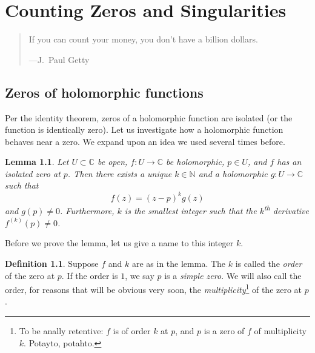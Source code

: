 \documentclass[12pt,openany]{book}
\newcommand{\C}{{\mathbb{C}}}
\newcommand{\N}{{\mathbb{N}}}
\newcommand{\myindex}[1]{#1\index{#1}}
\theoremstyle{plain}
\newtheorem{lemma}[thm]{Lemma}
\theoremstyle{remark}
\theoremstyle{definition}
\newtheorem{defn}[thm]{Definition}
\newenvironment{myepigraph}{%
    \begin{quote}%
    \begingroup\itshape
}{%
    \endgroup%
    \end{quote}
}
\theoremstyle{exercise}
\theoremstyle{example}
\begin{document}

\chapter{Counting Zeros and Singularities} \label{ch:counting}

\begin{myepigraph}
If you can count your money, you don't have a billion dollars.

---J.\ Paul Getty
\end{myepigraph}


\section{Zeros of holomorphic functions}

Per the identity theorem, zeros of a holomorphic function are
isolated (or the function is identically zero).  Let us investigate how a
holomorphic function behaves near a zero.
We expand upon an idea we used several times before.

\begin{lemma}
Let $U \subset \C$ be open, $f \colon U \to \C$ be holomorphic, $p \in U$,
and $f$ has an isolated zero at $p$.
Then there exists a unique $k \in \N$ and a holomorphic $g \colon U
\to \C$ such that
\begin{equation*}
f(z) = {(z-p)}^k g(z)
\end{equation*}
and $g(p) \not= 0$.
Furthermore, $k$ is the smallest integer such that the $k$\textsuperscript{th}
derivative $f^{(k)}(p) \not= 0$.
\end{lemma}

Before we prove the lemma, let us give a name to this integer $k$.

\begin{defn}
Suppose $f$ and $k$ are as in the lemma.
The $k$ is called the \emph{order}
of the zero at $p$.
If the order is $1$, we say $p$ is a \emph{\myindex{simple zero}}.
We will also call the order, for reasons that will be obvious very soon,
the \emph{multiplicity}\footnote{%
To be anally retentive: $f$ is of order $k$ at $p$,
and $p$ is a zero of $f$ of multiplicity $k$.  Potayto, potahto.}
of the zero at $p$.
\end{defn}
\end{document}
